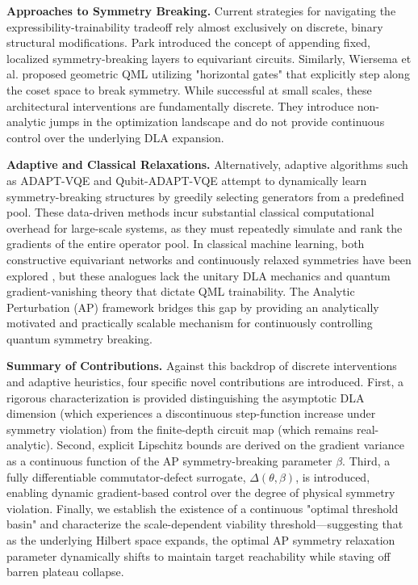 \documentclass[10pt,twocolumn]{article}
\theoremstyle{remark}
\begin{document}
\textbf{Approaches to Symmetry Breaking.} Current strategies for navigating the expressibility-trainability tradeoff rely almost exclusively on discrete, binary structural modifications. Park \cite{park2021symmetry, park2024symmetry} introduced the concept of appending fixed, localized symmetry-breaking layers to equivariant circuits. Similarly, Wiersema et al. \cite{wiersema2025geometric} proposed geometric QML utilizing "horizontal gates" that explicitly step along the coset space to break symmetry. While successful at small scales, these architectural interventions are fundamentally discrete. They introduce non-analytic jumps in the optimization landscape and do not provide continuous control over the underlying DLA expansion. 

\textbf{Adaptive and Classical Relaxations.} Alternatively, adaptive algorithms such as ADAPT-VQE and Qubit-ADAPT-VQE \cite{grimsley2019adapt,tang2021qubit} attempt to dynamically learn symmetry-breaking structures by greedily selecting generators from a predefined pool. These data-driven methods incur substantial classical computational overhead for large-scale systems, as they must repeatedly simulate and rank the gradients of the entire operator pool. In classical machine learning, both constructive equivariant networks and continuously relaxed symmetries have been explored \cite{finzi2021practical,vanderouderaa2022relaxed,kossaifi2024continuous}, but these analogues lack the unitary DLA mechanics and quantum gradient-vanishing theory that dictate QML trainability. The Analytic Perturbation (AP) framework bridges this gap by providing an analytically motivated and practically scalable mechanism for continuously controlling quantum symmetry breaking.

\textbf{Summary of Contributions.} Against this backdrop of discrete interventions and adaptive heuristics, four specific novel contributions are introduced. First, a rigorous characterization is provided distinguishing the asymptotic DLA dimension (which experiences a discontinuous step-function increase under symmetry violation) from the finite-depth circuit map (which remains real-analytic). Second, explicit Lipschitz bounds are derived on the gradient variance as a continuous function of the AP symmetry-breaking parameter $\beta$. Third, a fully differentiable commutator-defect surrogate, $\Delta(\theta, \beta)$, is introduced, enabling dynamic gradient-based control over the degree of physical symmetry violation. Finally, we establish the existence of a continuous "optimal threshold basin" and characterize the scale-dependent viability threshold---suggesting that as the underlying Hilbert space expands, the optimal AP symmetry relaxation parameter dynamically shifts to maintain target reachability while staving off barren plateau collapse.
\end{document}
